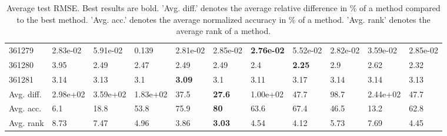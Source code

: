 \begin{table}[ht!]
\begin{tabular}{lllllllllll}
  361279 & 2.83e-02 & 5.91e-02 & 0.139 & 2.81e-02 & 2.85e-02 & \textbf{2.76e-02} & 5.52e-02 & 2.82e-02 & 3.59e-02 & 2.85e-02 \\ 
  361280 & 3.95 & 2.49 & 2.47 & 2.49 & 2.49 & 2.4 & \textbf{2.25} & 2.9 & 2.62 & 2.32 \\ 
  361281 & 3.14 & 3.13 & 3.1 & \textbf{3.09} & 3.1 & 3.11 & 3.17 & 3.14 & 3.14 & 3.13 \\ 
   \hline
Avg. diff. & 2.98e+02 & 3.59e+02 & 1.83e+02 & 37.5 & \textbf{27.6} & 1.00e+02 & 47.7 & 98.7 & 2.44e+02 & 47.7 \\ 
  Avg. acc. & 6.1 & 18.8 & 53.8 & 75.9 & \textbf{80} & 63.6 & 67.4 & 46.5 & 13.2 & 62.8 \\ 
  Avg. rank & 8.73 & 7.47 & 4.96 & 3.86 & \textbf{3.03} & 4.54 & 4.12 & 5.73 & 7.69 & 4.45 \\ 
   \hline
\hline
\end{tabular}
\endgroup
\caption{Average test RMSE. 
                  Best results are bold. 
                  'Avg. diff.' denotes the average relative difference in \% of a method compared to the best method.
                  'Avg. acc.' denotes the average normalized accuracy in \% of a method.
                  'Avg. rank' denotes the average rank of a method.} 
\label{TABLES/table_results_RMSE}
\end{table}
